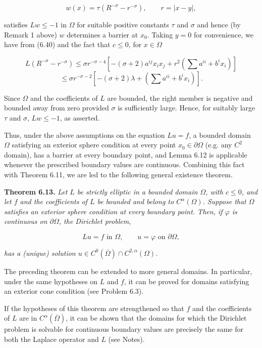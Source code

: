 \begin{equation}
w(x)=\tau\left(R^{-\sigma}-r^{-\sigma}\right),\qquad r=|x-y|,
\tag{6.45}
\end{equation}

satisfies $Lw\leq -1$ in $\Omega$ for suitable positive constants $\tau$ and $\sigma$ and hence (by Remark 1 above) $w$ determines a barrier at $x_{0}$. Taking $y=0$ for convenience, we have from (6.40) and the fact that $c\leq 0$, for $x\in\Omega$

\[
L(R^{-\sigma}-r^{-\sigma})\leq \sigma r^{-\sigma-4}\left[-(\sigma+2)a^{ij}x_{i}x_{j}+r^{2}\left(\sum a^{ii}+b^{i}x_{i}\right)\right]
\]
\[
\leq \sigma r^{-\sigma-2}\left[-(\sigma+2)\lambda+\left(\sum a^{ii}+b^{i}x_{i}\right)\right].
\]

Since $\Omega$ and the coefficients of $L$ are bounded, the right member is negative and bounded away from zero provided $\sigma$ is sufficiently large. Hence, for suitably large $\tau$ and $\sigma$, $Lw\leq -1$, as asserted.

Thus, under the above assumptions on the equation $Lu=f$, a bounded domain $\Omega$ satisfying an exterior sphere condition at every point $x_{0}\in\partial\Omega$ (e.g. any $C^{2}$ domain), has a barrier at every boundary point, and Lemma 6.12 is applicable whenever the prescribed boundary values are continuous. Combining this fact with Theorem 6.11, we are led to the following general existence theorem.

\textbf{Theorem 6.13.} \textit{Let $L$ be strictly elliptic in a bounded domain $\Omega$, with $c\leq 0$, and let $f$ and the coefficients of $L$ be bounded and belong to $C^{\alpha}(\Omega)$. Suppose that $\Omega$ satisfies an exterior sphere condition at every boundary point. Then, if $\varphi$ is continuous on $\partial\Omega$, the Dirichlet problem,}

\[
Lu=f\text{ in }\Omega,\qquad u=\varphi\text{ on }\partial\Omega,
\]

\textit{has a (unique) solution $u\in C^{0}(\overline{\Omega})\cap C^{2,\alpha}(\Omega)$.}

The preceding theorem can be extended to more general domains. In particular, under the same hypotheses on $L$ and $f$, it can be proved for domains satisfying an exterior cone condition (see Problem 6.3).


If the hypotheses of this theorem are strengthened so that $f$ and the coefficients
of $L$ are in $C^\alpha(\overline{\Omega})$, it can be shown that the domains for which the Dirichlet problem
is solvable for continuous boundary values are precisely the same for both the
Laplace operator and $L$ (see Notes).

